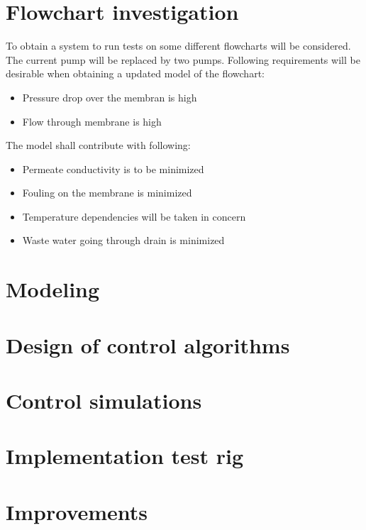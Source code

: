 
\section{Flowchart investigation}
To obtain a system to run tests on some different flowcharts will be considered. The current pump will be replaced by two pumps. Following requirements will be desirable when obtaining a updated model of the flowchart:
\begin{itemize}
\renewcommand\labelitemi{-}
\item Pressure drop over the membran is high
\item Flow through membrane is high
\end{itemize}
The model shall contribute with following:
\begin{itemize}
\renewcommand\labelitemi{-}
\item Permeate conductivity is to be minimized
\item Fouling on the membrane is minimized
\item Temperature dependencies will be taken in concern
\item Waste water going through drain is minimized
\end{itemize}




\section{Modeling}


\section{Design of control algorithms}

\section{Control simulations}

\section{Implementation test rig}

\section{Improvements}

